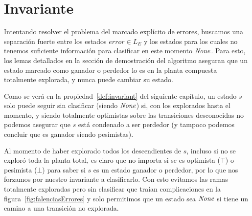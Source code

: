 \section{Invariante}\label{sct:invariante}

Intentando resolver el problema del marcado explícito de errores, buscamos una separación fuerte entre los estados $error \in L_E$ y los estados para los cuales no tenemos suficiente información para clasificar en este momento $\mathit{None}$. Para esto, los lemas detallados en la sección de demostración del algoritmo aseguran que un estado marcado como ganador o perdedor lo es en la planta compuesta totalmente explorada, y nunca puede cambiar su estado.

Como se verá en la propiedad~\ref{def:invariant} del siguiente capítulo, un estado $s$ solo puede seguir sin clasificar (siendo $\mathit{None}$) si, con los explorados hasta el momento, y siendo totalmente optimistas sobre las transiciones desconocidas no podemos asegurar que $s$ está condenado a ser perdedor (y tampoco podemos concluir que es ganador siendo pesimistas).

Al momento de haber explorado todos los descendientes de $s$, incluso si no se exploró toda la planta total, es claro que no importa si se es optimista ($\top$) o pesimista ($\bot$) para saber si $s$ es un estado ganador o perdedor, por lo que nos forzamos por nuestro invariante a clasificarlo. Con esto evitamos las ramas totalmente exploradas pero sin clasificar que traían complicaciones en la figura~\ref{fig:falenciasErrores} y solo permitimos que un estado sea $\mathit{None}$ si tiene un camino a una transición no explorada.\\



